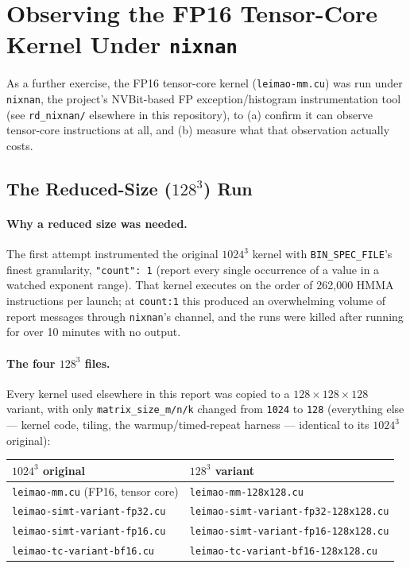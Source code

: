 \documentclass[11pt]{article}
\begin{document}
\section{Observing the FP16 Tensor-Core Kernel Under \texttt{nixnan}}
\label{sec:nixnan}

As a further exercise, the FP16 tensor-core kernel (\texttt{leimao-mm.cu}) was run under
\texttt{nixnan}, the project's NVBit-based FP exception/histogram instrumentation tool
(see \texttt{rd\_nixnan/} elsewhere in this repository), to (a) confirm it can observe
tensor-core instructions at all, and (b) measure what that observation actually costs.

\subsection{The Reduced-Size ($128^3$) Run}
\label{sec:reduced-size}

\paragraph{Why a reduced size was needed.} The first attempt instrumented the original
$1024^3$ kernel with \texttt{BIN\_SPEC\_FILE}'s finest granularity, \texttt{"count":\,1}
(report every single occurrence of a value in a watched exponent range). That kernel
executes on the order of 262{,}000 HMMA instructions per launch; at \texttt{count:1} this
produced an overwhelming volume of report messages through \texttt{nixnan}'s channel, and
the runs were killed after running for over 10 minutes with no output.

\paragraph{The four $128^3$ files.} Every kernel used elsewhere in this report was copied
to a $128\times128\times128$ variant, with only \texttt{matrix\_size\_m/n/k} changed from
\texttt{1024} to \texttt{128} (everything else --- kernel code, tiling, the
warmup/timed-repeat harness --- identical to its $1024^3$ original):

\begin{center}
\small
\begin{tabular}{ll}
\toprule
$1024^3$ original & $128^3$ variant \\
\midrule
\texttt{leimao-mm.cu} (FP16, tensor core) & \texttt{leimao-mm-128x128.cu} \\
\texttt{leimao-simt-variant-fp32.cu} & \texttt{leimao-simt-variant-fp32-128x128.cu} \\
\texttt{leimao-simt-variant-fp16.cu} & \texttt{leimao-simt-variant-fp16-128x128.cu} \\
\texttt{leimao-tc-variant-bf16.cu} & \texttt{leimao-tc-variant-bf16-128x128.cu} \\
\bottomrule
\end{tabular}
\end{center}
\end{document}
